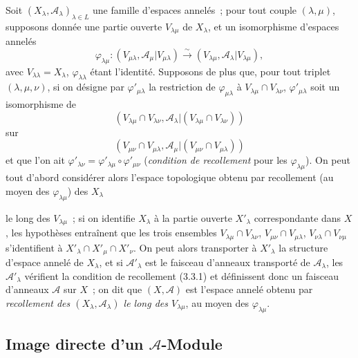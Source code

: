 \begin{env}[4.1.7]
\label{0.4.1.7-fr}
Soit $(X_\lambda,\mathcal{A}_\lambda)_{\lambda\in L}$ une famille d'espaces
annelés~; pour tout couple $(\lambda,\mu)$, supposons donnée une partie ouverte
$V_{\lambda\mu}$ de $X_\lambda$, et un isomorphisme d'espaces annelés
\[
  \varphi_{\lambda\mu}:
  (V_{\mu\lambda},\mathcal{A}_\mu|V_{\mu\lambda})
  \xrightarrow{\sim}
  (V_{\lambda\mu},\mathcal{A}_\lambda|V_{\lambda\mu}),
\]
avec $V_{\lambda\lambda}=X_\lambda$, $\varphi_{\lambda\lambda}$ étant
l'identité. Supposons de plus que, pour tout triplet $(\lambda,\mu,\nu)$, si
on désigne par $\varphi'_{\mu\lambda}$ la restriction de
$\varphi_{\mu\lambda}$ à $V_{\lambda\mu}\cap V_{\lambda\nu}$,
$\varphi'_{\mu\lambda}$ soit un isomorphisme de
\[
  (V_{\lambda\mu}\cap V_{\lambda\nu},
   \mathcal{A}_\lambda|(V_{\lambda\mu}\cap V_{\lambda\nu}))
\]
sur
\[
  (V_{\mu\nu}\cap V_{\mu\lambda},
   \mathcal{A}_\mu|(V_{\mu\nu}\cap V_{\mu\lambda}))
\]
et que l'on ait
$\varphi'_{\lambda\nu}=\varphi'_{\lambda\mu}\circ\varphi'_{\mu\nu}$
(\emph{condition de recollement} pour les $\varphi_{\lambda\mu}$). On peut
tout d'abord considérer alors l'espace topologique obtenu par recollement (au
moyen des $\varphi_{\lambda\mu}$) des $X_\lambda$

le long des $V_{\lambda\mu}$~; si on identifie $X_\lambda$ à la partie ouverte
$X'_\lambda$ correspondante dans $X$, les hypothèses entraînent que les trois
ensembles $V_{\lambda\mu}\cap V_{\lambda\nu}$,
$V_{\mu\nu}\cap V_{\mu\lambda}$,
$V_{\nu\lambda}\cap V_{\nu\mu}$ s'identifient à
$X'_\lambda\cap X'_\mu\cap X'_\nu$. On peut alors transporter à
$X'_\lambda$ la structure d'espace annelé de $X_\lambda$, et si
$\mathcal{A}'_\lambda$ est le faisceau d'anneaux transporté de
$\mathcal{A}_\lambda$, les $\mathcal{A}'_\lambda$ vérifient la condition de
recollement (3.3.1) et définissent donc un faisceau d'anneaux $\mathcal{A}$ sur
$X$~; on dit que $(X,\mathcal{A})$ est l'espace annelé obtenu par
\emph{recollement des $(X_\lambda,\mathcal{A}_\lambda)$ le long des
$V_{\lambda\mu}$}, au moyen des $\varphi_{\lambda\mu}$.
\end{env}

\subsection{Image directe d'un $\mathcal{A}$-Module}
\label{subsection:0.4.2-fr}

